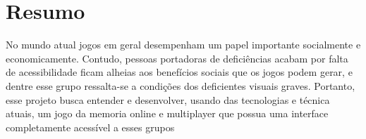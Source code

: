 \chapter{Resumo}

\label{chap:Resumo}

No mundo atual jogos em geral desempenham um papel importante socialmente e economicamente. Contudo, pessoas portadoras de deficiências acabam por falta de acessibilidade ficam alheias aos benefícios sociais que os jogos podem gerar, e dentre esse grupo ressalta-se a condições dos deficientes visuais graves. Portanto, esse projeto busca entender e desenvolver, usando das tecnologias e técnica atuais, um jogo da memoria online e multiplayer que possua uma interface completamente acessível a esses grupos

